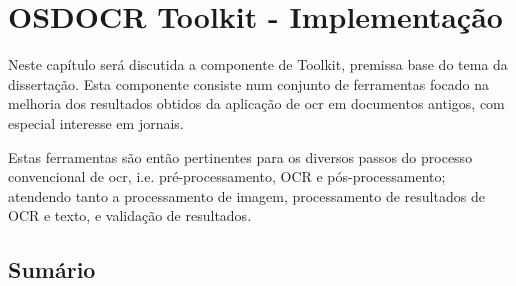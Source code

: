 \chapter{OSDOCR Toolkit - Implementação}
\label{cap_osdocr_toolkit_implementacao}

Neste capítulo será discutida a componente de Toolkit, premissa base do tema da dissertação. Esta componente consiste num conjunto de ferramentas focado na melhoria dos resultados obtidos da aplicação de \acrshort{ocr} em documentos antigos, com especial interesse em jornais. 

Estas ferramentas são então pertinentes para os diversos passos do processo convencional de \acrshort{ocr}, i.e. pré-processamento, OCR e pós-processamento; atendendo tanto a processamento de imagem, processamento de resultados de OCR e texto, e validação de resultados.


\section{Sumário}

